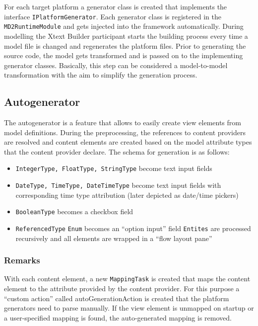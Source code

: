 
\label{sec:dev-preprocessor}

For each target platform a generator class  is created that implements the interface  \lstinline|IPlatformGenerator|. Each generator class is registered in the \lstinline|MD2RuntimeModule| and gets injected into the framework automatically. During modelling the Xtext Builder participant starts the building process every time a model file is changed and regenerates the platform files.
Prior to generating the source code, the model gets transformed and is passed on to the implementing generator classes. Basically, this step can be considered a model-to-model transformation with the aim to simplify the generation process.

\subsection{Autogenerator}
The autogenerator is a feature that allows to easily create view elements from model definitions. During the preprocessing, the references to content providers are resolved and content elements are created based on the model attribute types that the content provider declare. The schema for generation is as follows:

\begin{itemize}
	\item \lstinline!IntegerType, FloatType, StringType! become text input fields
	\item \lstinline!DateType, TimeType, DateTimeType! become text input fields with corresponding time type attribution (later depicted as date/time pickers)
	\item \lstinline!BooleanType! becomes a checkbox field
	\item \lstinline!ReferencedType!
		\subitem \lstinline!Enum! becomes an \enquote{option input} field
		\subitem \lstinline!Entites! are processed recursively and all elements are wrapped in a \enquote{flow layout pane}
\end{itemize}

\subsubsection{Remarks}
With each content element, a new \lstinline!MappingTask! is created that maps the content element to the attribute provided by the content provider. For this purpose a \enquote{custom action} called autoGenerationAction is created that the platform generators need to parse manually. If the view element is unmapped on startup or a user-specified mapping is found, the auto-generated mapping is removed.

